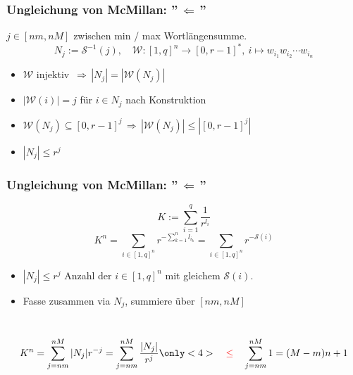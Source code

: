 \documentclass{beamer}
\begin{document}
\begin{frame}[t]
    \frametitle{Ungleichung von McMillan: ''$\,\Longleftarrow\,$''}
    $j \in [nm,nM]$ zwischen min / max Wortlängensumme.
    $$
        N_j := \mathcal{S}^{-1}(j),\quad
        \mathcal{W} : [1,q]^n \to [0,r-1]^{*},\ i \mapsto w_{i_1}w_{i_2}\cdots w_{i_n}
    $$
    \begin{itemize}
        \setlength\itemsep{1em}
        \item $\mathcal{W}$ injektiv $\,\Longrightarrow\, |N_j| = |\mathcal{W}(N_j)|$
        \pause
        \item $|\mathcal{W}(i)| = j$ für $i \in N_j$ nach Konstruktion
        \pause
        \item $\mathcal{W}(N_j) \subseteq [0,r-1]^j \,\Longrightarrow\, |\mathcal{W}(N_j)| \leq |[0,r-1]^j|$
        \pause
        \item $|N_j| \leq r^j$
    \end{itemize}
\end{frame}

\begin{frame}[t]
    \frametitle{Ungleichung von McMillan: ''$\,\Longleftarrow\,$''}
        $$
            K := \sum_{i=1}^{q} \frac{1}{r^{l_i}}
        $$
        $$
            K^n = \sum_{i\in [1,q]^n} r^{-\sum_{k=1}^{n} l_{i_k}} = \sum_{i\in [1,q]^n} r^{-\mathcal{S}(i)}
        $$
        \pause
        \begin{itemize}
            \setlength\itemsep{1em}
            \item { $|N_j| \leq r^j$} Anzahl der $i \in [1,q]^n$ mit gleichem $\mathcal{S}(i)$.
            \pause
            \item Fasse zusammen via $N_j$, summiere über $[nm,nM]$
        \end{itemize}
        \strut\\
        $$
            K^n = \sum_{j = nm}^{nM} |N_j|r^{-j} = \sum_{j = nm}^{nM} \frac{|N_j|}{r^j}
            \only<4>{
                \quad{\color{red}\leq}\quad \sum_{j = nm}^{nM} 1
                = (M-m)n + 1
            }
        $$
\end{frame}
\end{document}
